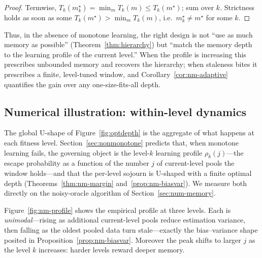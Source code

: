 \documentclass[11pt,a4paper]{article}
\begin{document}
\begin{proof}
  Termwise, $T_k(m_k^\star)=\min_m T_k(m)\le T_k(m^\star)$; sum over $k$.
  Strictness holds as soon as some $T_k(m^\star)>\min_m T_k(m)$, i.e.\
  $m_k^\star\ne m^\star$ for some $k$.
\end{proof}

Thus, in the absence of monotone learning, the right design is not
``use as much memory as possible'' (Theorem~\ref{thm:hierarchy}) but
``match the memory depth to the learning profile of the current level.''
When the profile is increasing this prescribes unbounded memory and
recovers the hierarchy; when staleness bites it prescribes a finite,
level-tuned window, and Corollary~\ref{cor:nm-adaptive} quantifies the
gain over any one-size-fits-all depth.

\subsection{Numerical illustration: within-level dynamics}
\label{sec:num-within}

The global U-shape of Figure~\ref{fig:optdepth} is the aggregate of what
happens at each fitness level.  Section~\ref{sec:nonmonotone} predicts
that, when monotone learning fails, the governing object is the level-$k$
learning profile $\rho_k(j)$---the escape probability as a function of
the number $j$ of current-level pools the window holds---and that the
per-level sojourn is U-shaped with a finite optimal depth
(Theorems~\ref{thm:nm-margin} and~\ref{prop:nm-biasvar}).  We measure both
directly on the noisy-oracle algorithm of Section~\ref{sec:num-memory}.

Figure~\ref{fig:nm-profile} shows the empirical profile at three levels.
Each is \emph{unimodal}---rising as additional current-level pools reduce
estimation variance, then falling as the oldest pooled data turn
stale---exactly the bias--variance shape posited in
Proposition~\ref{prop:nm-biasvar}.  Moreover the peak shifts to larger
$j$ as the level $k$ increases: harder levels reward deeper memory.
\end{document}
